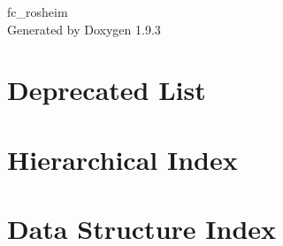 \documentclass[twoside]{book}
\newcommand{\+}{\discretionary{\mbox{\scriptsize$\hookleftarrow$}}{}{}}
\newcommand{\clearemptydoublepage}{%
    \newpage{\pagestyle{empty}\cleardoublepage}%
  }
\begin{document}
  \raggedbottom
    \hypersetup{pageanchor=false,
                bookmarksnumbered=true,
                pdfencoding=unicode
               }
  \begin{titlepage}
  \vspace*{7cm}
  \begin{center}%
  {\Large fc\+\_\+rosheim}\\
  \vspace*{1cm}
  {\large Generated by Doxygen 1.9.3}\\
  \end{center}
  \end{titlepage}
  \clearemptydoublepage
  \tableofcontents
  \clearemptydoublepage
  \hypersetup{pageanchor=true}
\chapter{Deprecated List}
\label{deprecated}

\chapter{Hierarchical Index}

\chapter{Data Structure Index}

\end{document}
